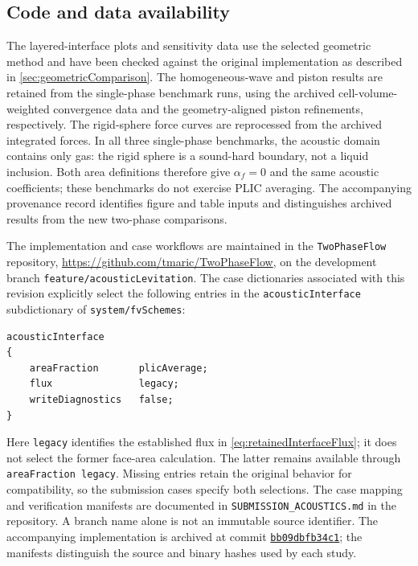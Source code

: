 \documentclass[final,12pt,nopreprintline,longtitle]{elsarticle}
\begin{document}
\begin{samepage}
\section*{Code and data availability}

The layered-interface plots and sensitivity data use the selected geometric
method and have been checked against the original implementation as described
in \cref{sec:geometricComparison}.  The homogeneous-wave and piston results
are retained from the single-phase benchmark runs, using the archived
cell-volume-weighted convergence data and the geometry-aligned piston
refinements, respectively.  The rigid-sphere force curves are reprocessed
from the archived integrated forces.  In all three single-phase benchmarks,
the acoustic domain contains only gas: the rigid sphere is a sound-hard
boundary, not a liquid inclusion.  Both area definitions therefore give
$\alpha_f=0$ and the same acoustic coefficients; these benchmarks do not
exercise PLIC averaging.  The accompanying provenance record identifies
figure and table inputs and distinguishes archived results from the new
two-phase comparisons.

The implementation and case workflows are maintained in the
\texttt{TwoPhaseFlow} repository,
\url{https://github.com/tmaric/TwoPhaseFlow}, on the development branch
\texttt{feature/acousticLevitation}.  The case dictionaries associated with
this revision explicitly select the following entries in the
\texttt{acousticInterface} subdictionary of \texttt{system/fvSchemes}:
\begin{verbatim}
acousticInterface
{
    areaFraction       plicAverage;
    flux               legacy;
    writeDiagnostics   false;
}
\end{verbatim}
\end{samepage}
Here \texttt{legacy} identifies the established flux in
\cref{eq:retainedInterfaceFlux}; it does not select the former face-area
calculation.  The latter remains available through
\texttt{areaFraction legacy}.  Missing entries retain the original behavior
for compatibility, so the submission cases specify both selections.
The case mapping and verification manifests are documented in
\texttt{SUBMISSION\_ACOUSTICS.md} in the repository.  A branch name alone is
not an immutable source identifier.  The accompanying implementation is
archived at commit \href{https://github.com/tmaric/TwoPhaseFlow/tree/bb09dbfb34c1830478feecd8dd445957ac15949c}{\texttt{bb09dbfb34c1}};
the manifests distinguish the source and binary hashes used by each study.
\end{document}
